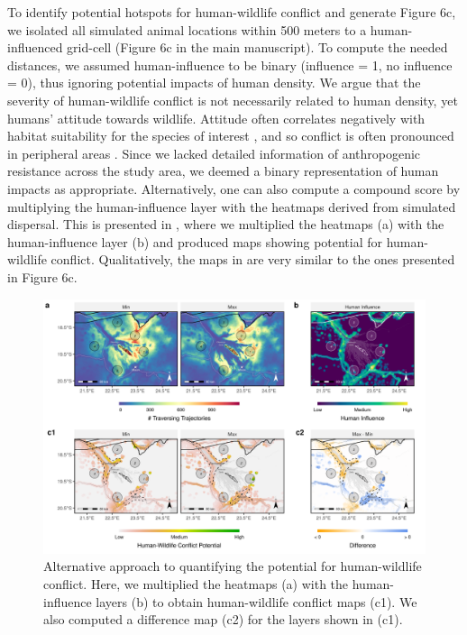 \documentclass[abstract=on,10pt,a4paper,bibliography=totocnumbered]{article}
\begin{document}
To identify potential hotspots for human-wildlife conflict and generate Figure
6c, we isolated all simulated animal locations within 500 meters to a
human-influenced grid-cell (Figure 6c in the main manuscript). To compute the
needed distances, we assumed human-influence to be binary (influence = 1, no
influence = 0), thus ignoring potential impacts of human density. We argue that
the severity of human-wildlife conflict is not necessarily related to human
density, yet humans' attitude towards wildlife. Attitude often correlates
negatively with habitat suitability for the species of interest
\citep{Behr.2017}, and so conflict is often pronounced in peripheral areas
\citep{McNutt.2017}. Since we lacked detailed information of anthropogenic
resistance \citep{Ghoddousi.2021} across the study area, we deemed a binary
representation of human impacts as appropriate. Alternatively, one can also
compute a compound score by multiplying the human-influence layer with the
heatmaps derived from simulated dispersal. This is presented in
, where we multiplied the heatmaps (a)
with the human-influence layer (b) and produced maps
showing potential for human-wildlife conflict. Qualitatively, the maps in
 are very similar to the ones presented in Figure 6c.

\begin{figure}[htbp]
  \begin{center}
  \includegraphics[width = \textwidth]{Figures/HumanWildlifeConflictAlternative.png}
  \caption{Alternative approach to quantifying the potential for human-wildlife
  conflict. Here, we multiplied the heatmaps (a) with the human-influence layers
  (b) to obtain human-wildlife conflict maps (c1). We also computed a difference
  map (c2) for the layers shown in (c1).}
  \label{HWCAlternative}
  \end{center}
\end{figure}

\newpage
\begingroup
\singlespacing
{}
\endgroup
\end{document}
